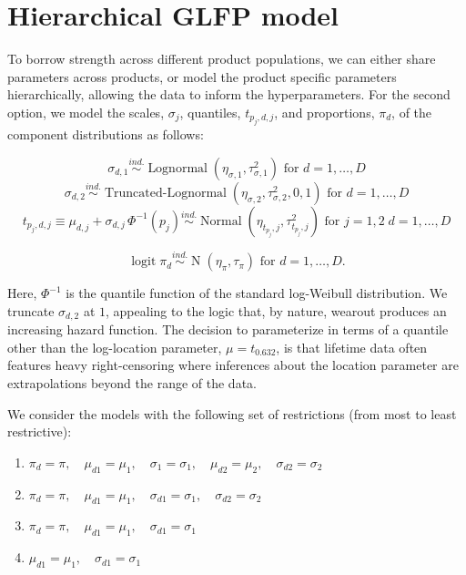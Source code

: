 \documentclass[12pt]{article}
\newcommand{\ind}{\stackrel{ind.}{\sim}}
\newcommand{\op}{\operatorname}
\begin{document}
\section{Hierarchical GLFP model}
\label{sec:Hierarchical GLFP model}

To borrow strength across different product populations, we can either share parameters across products, or model the product specific parameters hierarchically, allowing the data to inform the hyperparameters. For the second option, we model the scales, $\sigma_j$, quantiles, $t_{p_j,d,j}$, and proportions, $\pi_d$, of the component distributions as follows:

$$\sigma_{d,1} \ind \op{Lognormal} \left( \eta_{\sigma,1}, \tau^2_{\sigma,1} \right) \mbox{ for } d=1,\ldots,D$$
$$\sigma_{d,2} \ind \op{Truncated-Lognormal} \left( \eta_{\sigma,2}, \tau^2_{\sigma,2} , 0, 1 \right) \mbox{ for } d=1,\ldots,D$$
$$t_{p_j,d,j} \equiv \mu_{d,j} + \sigma_{d,j}\,\Phi^{-1}(p_j)  \ind \op{Normal} \left(\eta_{t_{p_j},j}, \tau^2_{t_{p_j},j}\right) \mbox{ for } j=1,2\; d=1,\ldots,D$$

$$\op{logit} \pi_d \ind \op{N}(\eta_\pi, \tau_\pi) \mbox{ for } d=1,\ldots,D.$$

Here, $\Phi^{-1}$ is the quantile function of the standard log-Weibull distribution. We truncate $\sigma_{d,2}$ at $1$, appealing to the logic that, by nature, wearout produces an increasing hazard function. The decision to parameterize in terms of a quantile other than the log-location parameter, $\mu = t_{0.632}$, is that lifetime data often features heavy right-censoring where inferences about the location parameter are extrapolations beyond the range of the data. %

We consider the models with the following set of restrictions (from most to least restrictive):

\begin{enumerate}
\item $\pi_{d} = \pi,\quad \mu_{d1} = \mu_1,\quad \sigma_{1}=\sigma_1,\quad \mu_{d2} = \mu_2,\quad \sigma_{d2} = \sigma_2$
\item $\pi_{d} = \pi,\quad \mu_{d1} = \mu_1,\quad \sigma_{d1}=\sigma_1,\quad \sigma_{d2} = \sigma_2$
\item $\pi_{d} = \pi,\quad \mu_{d1} = \mu_1,\quad \sigma_{d1}=\sigma_1$
\item $\mu_{d1} = \mu_1,\quad \sigma_{d1}=\sigma_1$
\end{enumerate}
\end{document}
